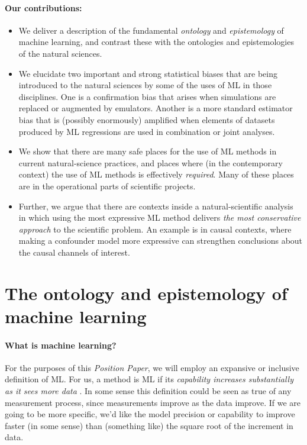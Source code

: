 \documentclass[10pt]{article}
\newcommand{\documentname}{\textsl{Position Paper}}
\begin{document}
\paragraph{Our contributions:}
\begin{itemize}
  \item We deliver a description of the fundamental \emph{ontology} and \emph{epistemology} of machine learning, and contrast these with the ontologies and epistemologies of the natural sciences.
  \item We elucidate two important and strong statistical biases that are being introduced to the natural sciences by some of the uses of ML in those disciplines. One is a confirmation bias that arises when simulations are replaced or augmented by emulators. Another is a more standard estimator bias that is (possibly enormously) amplified when elements of datasets produced by ML regressions are used in combination or joint analyses.
  \item We show that there are many safe places for the use of ML methods in current natural-science practices, and places where (in the contemporary context) the use of ML methods is effectively \emph{required}. Many of these places are in the operational parts of scientific projects.
  \item Further, we argue that there are contexts inside a natural-scientific analysis in which using the most expressive ML method delivers \emph{the most conservative approach} to the scientific problem. An example is in causal contexts, where making a confounder model more expressive can strengthen conclusions about the causal channels of interest.
\end{itemize}

\section{The ontology and epistemology of machine learning}\label{sec:philosophy}

\paragraph{What is machine learning?}
For the purposes of this \documentname, we will employ an expansive or inclusive definition of ML.
For us, a method is ML if its \emph{capability increases substantially as it sees more data} \cite{ml_definition}.
In some sense this definition could be seen as true of any measurement process, since measurements improve as the data improve. 
If we are going to be more specific, we'd like the model precision or capability to improve faster (in some sense) than (something like) the square root of the increment in data.
\end{document}

